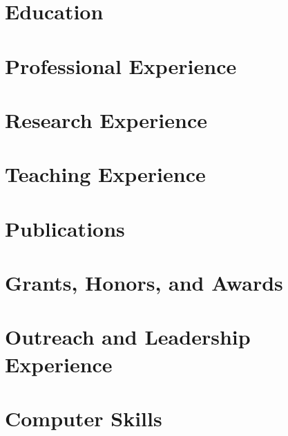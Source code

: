 \documentclass[11pt,letterpaper,sans]{moderncv}
\begin{document}
    \makecvtitle

\section{Education}
    
    

\section{Professional Experience}
    
    
    

\section{Research Experience}
    
    

\section{Teaching Experience}
    
    
    
    

\section{Publications}
    

\pagebreak
    
    
    

\section{Grants, Honors, and Awards}
    

\section{Outreach and Leadership Experience}
    

\section{Computer Skills}
    
\end{document}
